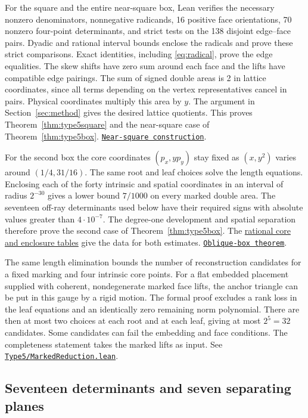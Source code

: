 \documentclass[11pt,letterpaper]{amsart}
\newcommand{\release}{bd3a0e03908481d738df30233cf95c641a1d3f71}
\newcommand{\reporef}[2]{\href{https://github.com/vltanh/lean4-origami-torus/blob/\release/#1}{#2}}
\newcommand{\src}[2]{\href{https://github.com/vltanh/lean4-origami-torus/blob/\release/#1}{\texttt{#2}}}
\begin{document}
For the square and the entire near-square box, Lean verifies
the necessary nonzero denominators, nonnegative radicands, 16
positive face orientations, 70 nonzero four-point determinants,
and strict tests on the 138 disjoint edge--face pairs.
Dyadic and rational interval bounds enclose the radicals and
prove these strict comparisons. Exact identities, including
\eqref{eq:radical}, prove the edge equalities.
The skew shifts have zero sum around each face and the lifts
have compatible edge pairings. The sum of signed double areas
is 2 in lattice coordinates, since all terms depending on the
vertex representatives cancel in pairs. Physical coordinates
multiply this area by \(y\). The argument in
Section~\ref{sec:method} gives the desired lattice
quotients. This proves Theorem~\ref{thm:type5square} and the
near-square case of Theorem~\ref{thm:type5box}.
\src{OrigamiTorus/EightVertex/Type5/ContinuationTorus.lean}{Near-square construction}.

For the second box the core coordinates \((p_x,yp_y)\) stay fixed
as \((x,y^2)\) varies around \((1/4,31/16)\). The same root and leaf
choices solve the length equations. Enclosing each of the forty
intrinsic and spatial coordinates in an interval of radius \(2^{-30}\)
gives a lower bound \(7/1000\) on every marked double area. The
seventeen off-ray determinants used below have their required signs
with absolute values greater than \(4\cdot10^{-7}\). The degree-one
development and spatial separation therefore prove the second case of
Theorem~\ref{thm:type5box}. The
\reporef{docs/EightVertex/Type5HandProof.md}{rational core and enclosure tables}
give the data for both estimates.
\src{OrigamiTorus/EightVertex/Type5/OffRayBase.lean}{Oblique-box theorem}.

The same length elimination bounds the number of reconstruction
candidates for a fixed marking and four intrinsic core points.
For a flat embedded placement supplied with coherent,
nondegenerate marked face lifts, the anchor triangle can be
put in this gauge by a rigid motion. The formal proof excludes
a rank loss in the leaf equations and an identically zero
remaining norm polynomial. There are then at most two choices
at each root and at each leaf, giving at most \(2^5=32\)
candidates. Some candidates can fail the embedding and face
conditions. The completeness statement takes the marked lifts
as input. See
\src{OrigamiTorus/EightVertex/Type5/MarkedReduction.lean}{Type5/MarkedReduction.lean}.

\subsection*{Seventeen determinants and seven separating planes}
\end{document}
